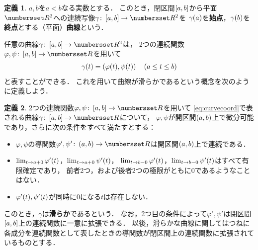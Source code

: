 \documentclass[11pt,a4paper]{ltjsarticle}
\newcommand*{\definition}[1]{\textbf{#1}}
\newcommand*{\coord}[1]{\paren{#1}}
\theoremstyle{definition}
\newtheorem{dfn}{定義}[section]
\begin{document}
\begin{dfn} \label{dfn:curve}
  $a,b$を$a < b$なる実数とする．
  このとき，閉区間$\interval{c}{a,b}$から平面$\Real^2$への連続写像$\gamma \colon \interval{c}{a,b} \to \Real^2$を
  $\apply{\gamma}{a}$を\definition{始点}，$\apply{\gamma}{b}$を\definition{終点}とする（平面）\definition{曲線}という．
\end{dfn}

任意の曲線$\gamma \colon \interval{c}{a,b} \to \Real^2$は，
2つの連続関数$\varphi, \psi \colon \interval{c}{a,b} \to \Real$を用いて
\begin{align}
  \apply{\gamma}{t} = \coord{\apply{\varphi}{t}, \apply{\psi}{t}} \quad \text{($a \leq t \leq b$)}
  \label{eq:curvecoord}
\end{align}
と表すことができる．
これを用いて曲線が滑らかであるという概念を次のように定義しよう．

\begin{dfn} \label{dfn:smooth}
  2つの連続関数$\varphi, \psi \colon \interval{c}{a,b} \to \Real$を用いて
  \cref{eq:curvecoord}で表される曲線$\gamma \colon \interval{c}{a,b} \to \Real$について，
  $\varphi, \psi$が開区間$\interval{op}{a,b}$上で微分可能であり，さらに次の条件をすべて満たすとする：
  \begin{itemize}
    \item $\varphi, \psi$の導関数$\varphi ', \psi ' \colon \interval{op}{a,b} \to \Real$は開区間$\interval{op}{a,b}$上で連続である．
    \item $\lim_{t \to a + 0}\apply{\varphi '}{t}$，$\lim_{t \to a + 0}\apply{\psi '}{t}$，
      $\lim_{t \to b - 0}\apply{\varphi '}{t}$，$\lim_{t \to b - 0}\apply{\psi '}{t}$はすべて有限確定であり，
      前者2つ，および後者2つの極限がともに0であるようなことはない．
    \item $\apply{\varphi'}{t}, \apply{\psi'}{t}$が同時に0になる$t$は存在しない．
  \end{itemize}
  このとき，$\gamma$は\definition{滑らか}であるという．
  なお，2つ目の条件によって$\varphi', \psi'$は閉区間$\interval{c}{a,b}$上の連続関数に一意に拡張できる．
  以後，滑らかな曲線に関してはつねに各成分を連続関数として表したときの導関数が閉区間上の連続関数に拡張されているものとする．
\end{dfn}
\end{document}
